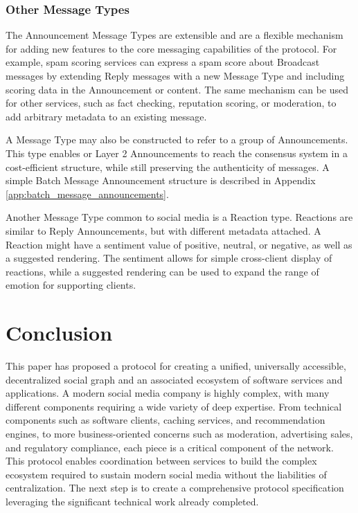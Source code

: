 \documentclass[12pt,letterpaper]{article}
\begin{document}
\subsubsection{Other Message Types}

The Announcement Message Types are extensible and are a flexible mechanism for adding new
features to the core messaging capabilities of the protocol. For example, spam scoring
services can express a spam score about Broadcast messages by extending Reply messages with
a new Message Type and including scoring data in the Announcement or content. The same
mechanism can be used for other services, such as fact checking, reputation scoring, or
moderation, to add arbitrary metadata to an existing message.

A Message Type may also be constructed to refer to a group of Announcements. This type
enables  or Layer 2 Announcements to reach the consensus system in a
cost-efficient structure, while still preserving the authenticity of messages. A simple
Batch Message Announcement structure is described in Appendix
\ref{app:batch_message_announcements}.

Another Message Type common to social media is a Reaction type. Reactions are similar to
Reply Announcements, but with different metadata attached. A Reaction might have a sentiment
value of positive, neutral, or negative, as well as a suggested rendering. The sentiment
allows for simple cross-client display of reactions, while a suggested rendering can be used
to expand the range of emotion for supporting clients.


\section{Conclusion}\label{sec:conclusion}

This paper has proposed a protocol for creating a unified, universally accessible,
decentralized social graph and an associated ecosystem of software services and
applications. A modern social media company is highly complex, with many different
components requiring a wide variety of deep expertise. From technical components such as
software clients, caching services, and recommendation engines,\cite{hashemi2017} to more
business-oriented concerns such as moderation, advertising sales, and regulatory compliance,
each piece is a critical component of the network. This protocol enables coordination
between services to build the complex ecosystem required to sustain modern social media
without the liabilities of centralization. The next step is to create a comprehensive
protocol specification leveraging the significant technical work already completed.
\end{document}
